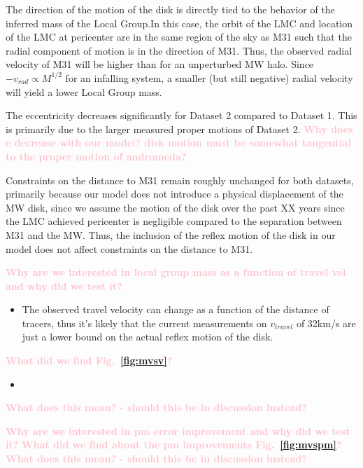 \documentclass[twocolumn]{aastex631}
\newcommand{\kc}[1]{\textcolor{pink}{\textbf{#1}} }
\begin{document}
The direction of the motion of the disk is directly tied to the behavior of the inferred mass of the Local Group.In this case, the orbit of the LMC and location of the LMC at pericenter are in the same region of the sky as M31 such that the radial component of motion is in the direction of M31. Thus, the observed radial velocity of M31 will be higher than for an unperturbed MW halo. Since $-v_{rad}\propto M^{1/2}$ for an infalling system, a smaller (but still negative) radial velocity will yield a lower Local Group mass. 

The eccentricity decreases significantly for Dataset 2 compared to Dataset 1. This is primarily due to the larger measured proper motions of Dataset 2. \kc{Why does e decrease with our model? disk motion must be somewhat tangential to the proper motion of andromeda? }

Constraints on the distance to M31 remain roughly unchanged for both datasets, primarily because our model does not introduce a physical displacement of the MW disk, since we assume the motion of the disk over the past XX years since the LMC achieved pericenter is negligible compared to the separation between M31 and the MW. Thus, the inclusion of the reflex motion of the disk in our model does not affect constraints on the distance to M31. 


\kc{Why are we interested in local group mass as a function of travel vel and why did we test it?}
\begin{itemize}
  \item The observed travel velocity can change as a function of the distance of tracers, thus it's likely that the current measurements on $v_{travel}$ of 32km/s are just a lower bound on the actual reflex motion of the disk. 
\end{itemize}
\kc{What did we find Fig.~\ref{fig:mvsv}?}
\begin{itemize}
  \item 
\end{itemize}
\kc{What does this mean? - should this be in discussion instead? }

\kc{Why are we interested in pm error improvement and why did we test it?}
\kc{What did we find about the pm improvements Fig.~\ref{fig:mvspm}?}
\kc{What does this mean? - should this be in discussion instead? }
\end{document}
